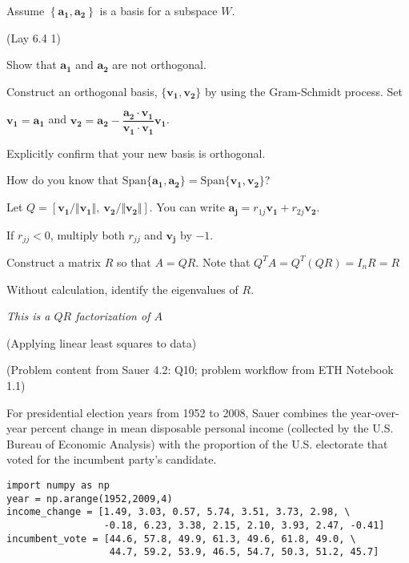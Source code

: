 \documentclass[12pt,letterpaper,noanswers]{exam}
\newcommand{\vc}[1]{\boldsymbol{#1}}
\begin{document}
\begin{questions}
\begin{parts}
Assume $\left\{\vc{a_1},\vc{a_2}\right\}$ is a basis for a subspace $W$.
\begin{subparts}
\item (Lay 6.4 1)

  Show that $\vc{a_1}$ and $\vc{a_2}$ are not orthogonal.

Construct an orthogonal basis, $\{\vc{v_1},\vc{v_2}\}$ by using the Gram-Schmidt process.  Set

$\vc{v_1} = \vc{a_1}$ and $\vc{v_2} = \vc{a_2} - \dfrac{\vc{a_2}\cdot \vc{v_1}}{\vc{v_1}\cdot\vc{v_1}}\vc{v_1}$.

Explicitly confirm that your new basis is orthogonal.

How do you know that $\text{Span}\{\vc{a_1},\vc{a_2}\} = \text{Span}\{\vc{v_1},\vc{v_2}\}$?

\item Let $Q = \left[ \vc{v_1}/\Vert\vc{v_1}\Vert,\ \vc{v_2}/\Vert\vc{v_2}\Vert\right]$.  You can write $\vc{a_j} = r_{1j}\vc{v_1} + r_{2j}\vc{v_2}$.

If $r_{jj}<0$, multiply both $r_{jj}$ and $\vc{v_j}$ by $-1$.


Construct a matrix $R$ so that $A = QR$.  Note that $Q^TA = Q^T(QR) = I_n R = R$

Without calculation, identify the eigenvalues of $R$.

\emph{This is a $QR$ factorization of $A$}
\end{subparts}


\end{parts}
\question (Applying linear least squares to data) 

(Problem content from Sauer 4.2: Q10; problem workflow from ETH Notebook 1.1) 

For presidential election years from 1952 to 2008, Sauer combines the year-over-year percent change in mean disposable personal income (collected by the U.S. Bureau of Economic Analysis) with the proportion of the U.S. electorate that voted for the incumbent party's candidate.  

\begin{verbatim}
import numpy as np
year = np.arange(1952,2009,4)
income_change = [1.49, 3.03, 0.57, 5.74, 3.51, 3.73, 2.98, \
                 -0.18, 6.23, 3.38, 2.15, 2.10, 3.93, 2.47, -0.41]
incumbent_vote = [44.6, 57.8, 49.9, 61.3, 49.6, 61.8, 49.0, \
                  44.7, 59.2, 53.9, 46.5, 54.7, 50.3, 51.2, 45.7]
\end{verbatim}


\end{questions}
\end{document}
